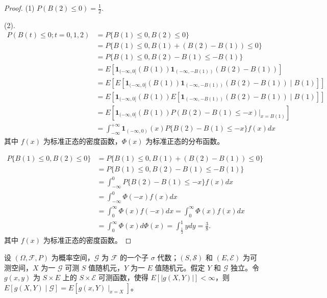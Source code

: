 \documentclass[lang=cn,10pt,thmcnt=section]{elegantbook}
\begin{document}
\begin{proof}
	(1) $P(B(2) \leq 0) = \frac{1}{2}$.

(2).
\begin{align*}
P(B(t) \leq 0; t = 0, 1, 2) &= P\{B(1) \leq 0, B(2) \leq 0\} \\
&= P\{B(1) \leq 0, B(1) + (B(2) - B(1)) \leq 0\} \\
&= P\{B(1) \leq 0, B(2) - B(1) \leq -B(1)\} \\
&= E\left[\mathbf{1}_{(-\infty,0]}(B(1)) \mathbf{1}_{(-\infty,-B(1))}(B(2) - B(1))\right] \\
&= E\left[E\left[\mathbf{1}_{(-\infty,0]}(B(1)) \mathbf{1}_{(-\infty,-B(1))}(B(2) - B(1)) \mid B(1)\right]\right] \\
&= E\left[\mathbf{1}_{(-\infty,0]}(B(1)) E\left[\mathbf{1}_{(-\infty,-B(1))}(B(2) - B(1)) \mid B(1)\right]\right] \\
&= E\left[\mathbf{1}_{(-\infty,0]}(B(1)) P(B(2) - B(1) \leq -x) \bigg|_{x = B(1)}\right] \\
&= \int_{-\infty}^{+\infty} \mathbf{1}_{(-\infty,0)}(x) P\{B(2) - B(1) \leq -x\} f(x) dx
\end{align*}
其中 $f(x)$ 为标准正态的密度函数，$\Phi(x)$ 为标准正态的分布函数。

\begin{align*}
P\{B(1) \leq 0, B(2) \leq 0\} &= P\{B(1) \leq 0, B(1) + (B(2) - B(1)) \leq 0\} \\
&= P\{B(1) \leq 0, B(2) - B(1) \leq -B(1)\} \\
&= \int_{-\infty}^{0} P\{B(2) - B(1) \leq -x\} f(x) dx \\
&= \int_{-\infty}^{0} \Phi(-x) f(x) dx \\
&= \int_{0}^{\infty} \Phi(x) f(-x) dx = \int_{0}^{\infty} \Phi(x) f(x) dx \\
&= \int_{0}^{\infty} \Phi(x) d\Phi(x) = \int_{\frac{1}{2}}^{1} y dy = \frac{3}{8}.
\end{align*}
其中 $f(x)$ 为标准正态的密度函数。
\end{proof}
\begin{theorem}
	设 $(\Omega, \mathcal{F}, P)$ 为概率空间，$\mathcal{G}$ 为 $\mathcal{F}$ 的一个子 $\sigma$ 代数；$(S, \mathcal{S})$ 和 $(E, \mathcal{E})$ 为可测空间，$X$ 为一 $\mathcal{G}$ 可测 $S$ 值随机元，$Y$ 为一 $E$ 值随机元。假定 $Y$ 和 $\mathcal{G}$ 独立。令 $g(x, y)$ 为 $S \times E$ 上的 $S \times \mathcal{E}$ 可测函数，使得 $E[|g(X, Y)|] < \infty$，则 $E[g(X, Y) \mid \mathcal{G}] = E[g(x, Y) \mid_{x = X}]$。
\end{theorem}
\end{document}
